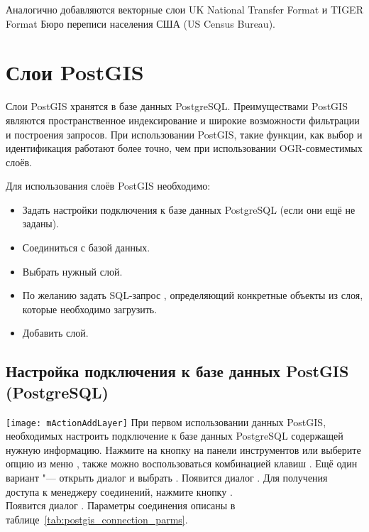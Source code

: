 Аналогично добавляются векторные слои UK National Transfer Format и
TIGER Format Бюро переписи населения США (US Census Bureau).

\section{Слои PostGIS}
\label{label_postgis}

Слои PostGIS хранятся в базе данных PostgreSQL. Преимуществами PostGIS
являются пространственное индексирование и широкие возможности
фильтрации и построения запросов. При использовании PostGIS, такие функции,
как выбор и идентификация работают более точно, чем при использовании
OGR-совместимых слоёв.

Для использования слоёв PostGIS необходимо:

\begin{itemize}[label=--]
\item Задать настройки подключения \qg к базе данных PostgreSQL (если они
ещё не заданы).
\item Соединиться с базой данных.
\item Выбрать нужный слой.
\item По желанию задать SQL-запрос , определяющий конкретные
объекты из слоя, которые необходимо загрузить.
\item Добавить слой.
\end{itemize}

\subsection{Настройка подключения к базе данных PostGIS (PostgreSQL)}\label{sec:postgis_stored}

\texttt{[image: mActionAddLayer]} При первом использовании
данных PostGIS, необходимых настроить подключение к базе данных PostgreSQL
содержащей нужную информацию. Нажмите на кнопку
 на панели инструментов
или выберите опцию 
из меню , также можно воспользоваться комбинацией клавиш
. Ещё один вариант "--- открыть диалог
 и выбрать .
Появится диалог . Для получения доступа
к менеджеру соединений, нажмите кнопку
. \\
Появится диалог . Параметры соединения
описаны в таблице~\ref{tab:postgis_connection_parms}.

